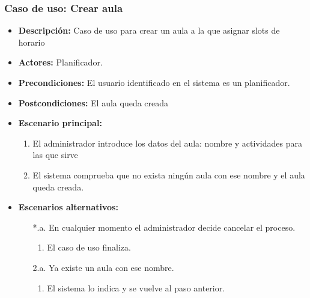 \subsubsection*{Caso de uso: Crear aula}
\begin{itemize}
\item{\bf Descripción:} Caso de uso para crear un aula a la que asignar slots de horario
\item{\bf Actores:} Planificador.
\item{\bf Precondiciones:} El usuario identificado en el sistema es un planificador.
\item{\bf Postcondiciones:} El aula queda creada
\item{\bf Escenario principal:}
	\begin{enumerate}
	\item El administrador introduce los datos del aula: nombre y actividades para las que sirve
	\item El sistema comprueba que no exista ningún aula con ese nombre y el aula queda creada.
	\end{enumerate}
\item{\bf Escenarios alternativos:}
	\begin{itemize}
		\item[*.a.] En cualquier momento el administrador decide cancelar el proceso.
		\begin{enumerate}
			\item El caso de uso finaliza.
		\end{enumerate}
		\item[2.a.] Ya existe un aula con ese nombre.
		\begin{enumerate}
			\item El sistema lo indica y se vuelve al paso anterior.
		\end{enumerate}
	\end{itemize}
\end{itemize}



